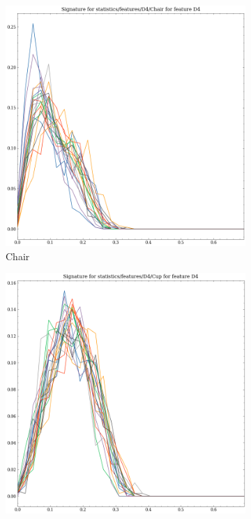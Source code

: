 \begin{figure}[t!p]
    
    \begin{subfigure}[b]{0.23\textwidth}
        \includegraphics[width=\textwidth]{assets/feature_extraction/D4/Chair.png}
        \caption{Chair}
    \end{subfigure}
    \hfill
    \begin{subfigure}[b]{0.23\textwidth}
        \includegraphics[width=\textwidth]{assets/feature_extraction/D4/Cup.png}

\end{subfigure}
\end{figure}
